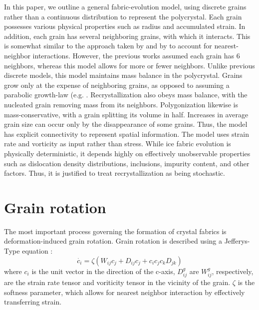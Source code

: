 \documentclass{igs}
\begin{document}
In this paper, we outline a general fabric-evolution model, using discrete grains rather than a continuous distribution to represent the polycrystal. Each grain possesses various physical properties such as radius and accumulated strain. In addition, each grain has several neighboring grains, with which it interacts. This is somewhat similar to the approach taken by \citet{thorsteinsson2002nni} and by \citet{kennedy} to account for nearest-neighbor interactions. However, the previous works assumed each grain has 6 neighbors, whereas this model allows for more or fewer neighbors. Unlike previous discrete models, this model maintains mass balance in the polycrystal. Grains grow only at the expense of neighboring grains, as opposed to assuming a parabolic growth-law (e.g. \citet{gow1969}. Recrystallization also obeys mass balance, with the nucleated grain removing mass from its neighbors. Polygonization likewise is mass-conservative, with a grain splitting its volume in half. Increases in average grain size can occur only by the disappearance of some grains. Thus, the model has explicit connectivity to represent spatial information. The model uses strain rate and vorticity as input rather than stress. While ice fabric evolution is physically deterministic, it depends highly on effectively unobservable properties such as dislocation density distributions, inclusions, impurity content, and other factors. Thus, it is justified to treat recrystallization as being stochastic. 


\section{Grain rotation}
The most important process governing the formation of crystal fabrics is deformation-induced grain rotation. Grain rotation is described using a Jefferys-Type equation \citep{azuma94}:
\begin{equation}
   \dot{c_i} = \zeta \left( W_{ij}  c_j + D_{ij} c_j + c_i c_j c_k D_{jk} \right)
\end{equation}
where $c_i$ is the unit vector in the direction of the c-axis, $D^g_{ij}$ are $W^g_{ij}$, respectively, are the strain rate tensor and voriticity tensor in the vicinity of the grain. $\zeta$ is the softness parameter, which allows for nearest neighbor interaction by effectively transferring strain.  
\end{document}
